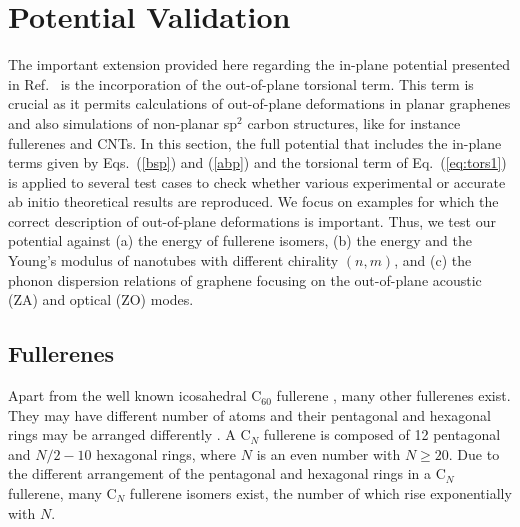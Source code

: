 \documentclass[aps,prb,floatfix,twocolumn,showpacs]{revtex4}
\begin{document}
\section{Potential Validation\label{pot_valid}}

The important extension provided here regarding the in-plane potential presented in Ref.~
is the incorporation of the out-of-plane torsional term. This term is crucial as it permits calculations of out-of-plane
deformations in planar graphenes and also simulations of non-planar sp$^2$ carbon structures, like for instance
fullerenes and CNTs.
In this section, the full potential that includes the in-plane terms given by Eqs.~(\ref{bsp}) and (\ref{abp})
and the torsional term of Eq.~(\ref{eq:tors1}) is applied to several
test  cases to check whether various experimental or accurate ab initio theoretical results  are reproduced. 
We focus on examples for which the correct description of out-of-plane deformations is important.
Thus, we test our potential against (a)  the energy of fullerene isomers, (b) the energy and the Young's modulus
of nanotubes with different chirality $(n,m)$, and (c) the phonon dispersion relations of graphene 
focusing on the out-of-plane acoustic (ZA) and optical (ZO) modes.

\subsection{Fullerenes\label{sec:fullerenes}}

Apart from the well known icosahedral C$_{60}$ fullerene \cite{Kroto},
many other fullerenes exist. They may have different number of atoms and 
their pentagonal and hexagonal rings may be arranged differently \cite{atlas}. 
A C$_N$ fullerene is composed of 12 pentagonal and $N/2-10$ hexagonal
rings, where $N$ is an even number with $N\ge 20$. Due to the different 
arrangement of the pentagonal and hexagonal rings in a C$_{N}$ fullerene, 
many C$_N$ fullerene isomers exist, the number of which rise exponentially\cite{atlas} with $N$.
\end{document}
